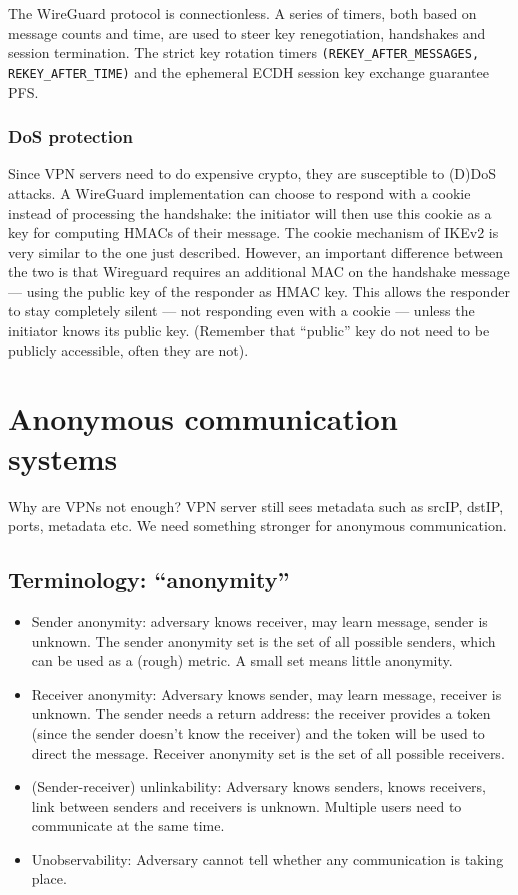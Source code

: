 \documentclass[11pt,oneside,a4paper]{article}
\begin{document}
The WireGuard protocol is connectionless. A series of timers, both based on message counts and time, are used to steer key renegotiation, handshakes and session termination. The strict key rotation timers \texttt{(REKEY\_AFTER\_MESSAGES, REKEY\_AFTER\_TIME)} and the ephemeral
ECDH session key exchange guarantee PFS.

\subsubsection{DoS protection}

Since VPN servers need to do expensive crypto, they are susceptible to (D)DoS attacks. A WireGuard implementation can choose to respond with a cookie instead of processing the handshake: the initiator will then use this cookie as a key for computing HMACs of their message. The cookie mechanism of IKEv2 is very similar to the one just described. However, an important difference between the two is that Wireguard requires an additional MAC on the handshake message — using the public key of the responder as HMAC key. This allows the responder to stay completely silent — not responding even with a cookie — unless the initiator knows its public key. (Remember that “public” key do not need to be publicly accessible, often they are not).

\newpage

\section{Anonymous communication systems}

Why are VPNs not enough? VPN server still sees metadata such as srcIP, dstIP, ports, metadata etc. We need something stronger for anonymous communication. 

\subsection{Terminology: “anonymity”}

\vspace{-\topsep}
\begin{itemize}
	\setlength{\itemsep}{0pt}
	\setlength{\parskip}{0pt}
	\item Sender anonymity: adversary knows receiver, may learn message, sender is unknown. The sender anonymity set is the set of all possible senders, which can be used as a (rough) metric. A small set means little anonymity.
	\item Receiver anonymity: Adversary knows sender, may learn message, receiver is unknown. The sender needs a return address: the receiver provides a token (since the sender doesn't know the receiver) and the token will be used to direct the message. Receiver anonymity set is the set of all possible receivers.
	\item (Sender-receiver) unlinkability: Adversary knows senders, knows receivers, link between senders and	receivers is unknown. Multiple users need to communicate at the same time.
	\item Unobservability: Adversary cannot tell whether any communication is taking place.
\end{itemize}
\vspace{-\topsep}
\end{document}
